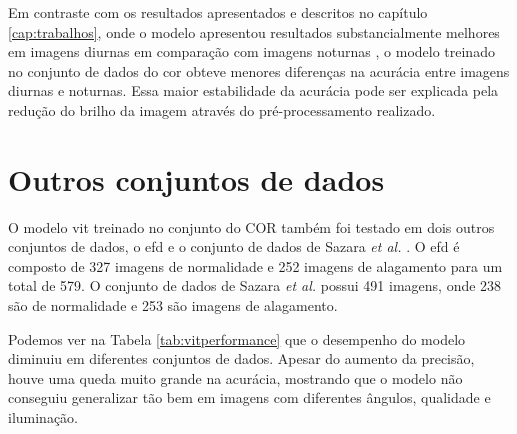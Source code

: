 
Em contraste com os resultados apresentados e descritos no capítulo \ref{cap:trabalhos}, 
onde o modelo apresentou resultados substancialmente melhores em imagens diurnas em comparação com imagens noturnas \cite{piedad2022},
o modelo treinado no conjunto de dados do \acrshort{cor} obteve menores diferenças na acurácia entre imagens diurnas e noturnas.
Essa maior estabilidade da acurácia pode ser explicada pela redução do brilho da imagem através do pré-processamento realizado.
\section{Outros conjuntos de dados}\label{sec:resultados_outros}

O modelo \acrshort{vit} treinado no conjunto do COR também foi testado em dois outros conjuntos de dados, 
o \acrfull{efd} \cite{BarzSchroeterMuench2018_1000117723} e o conjunto de dados de Sazara \textit{et al.} \cite{sazara2019}.
O \acrshort{efd} é composto de 327 imagens de normalidade e 252 imagens de alagamento para um total de 579.
O conjunto de dados de Sazara \textit{et al.} possui 491 imagens, onde 238 são de normalidade e 253 são imagens de alagamento.

Podemos ver na Tabela \ref{tab:vitperformance} que o desempenho do modelo diminuiu em diferentes conjuntos de dados. 
Apesar do aumento da precisão, houve uma queda muito grande na acurácia, mostrando que o modelo não conseguiu generalizar tão bem em imagens com diferentes ângulos, qualidade e iluminação.

